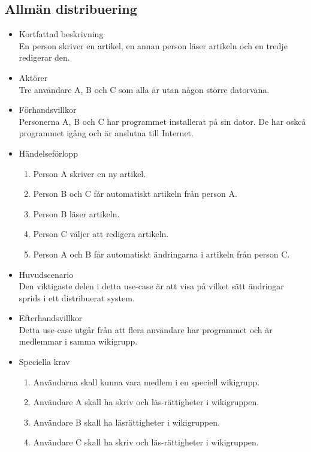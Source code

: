 \subsection{Allmän distribuering}
\begin{itemize}
	\item Kortfattad beskrivning
	\\En person skriver en artikel, en annan person läser artikeln och en tredje redigerar den.
	\item Aktörer
	\\Tre användare A, B och C som alla är utan någon större datorvana.
	\item Förhandsvillkor
	\\Personerna A, B och C har programmet installerat på sin dator. De har oskcå programmet igång och är anslutna till Internet.
	\item Händelseförlopp
	\begin{enumerate}
		\item Person A skriver en ny artikel.
		\item Person B och C får automatiskt artikeln från person A.
		\item Person B läser artikeln.
		\item Person C väljer att redigera artikeln.
		\item Person A och B får automatiskt ändringarna i artikeln från person C.
	\end{enumerate}	
	\item Huvudscenario
	\\Den viktigaste delen i detta use-case är att visa på vilket sätt ändringar sprids i ett distribuerat system.
	\item Efterhandsvillkor
	\\Detta use-case utgår från att flera användare har programmet och är medlemmar i samma wikigrupp.
	\item Speciella krav
	\begin{enumerate}	
		\item Användarna skall kunna vara medlem i en speciell wikigrupp.
		\item Användare A skall ha skriv och läs-rättigheter i wikigruppen.
		\item Användare B skall ha läsrättigheter i wikigruppen.
		\item Användare C skall ha skriv och läs-rättigheter i wikigruppen.
	\end{enumerate}
\end{itemize}


